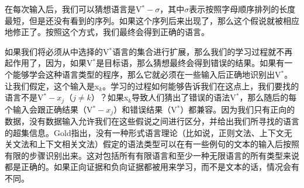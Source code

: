 \noindent
在每次输入后，我们可以猜想语言是V$^* - \sigma$，其中$\sigma$表示按照字母顺序排列的长度最短，但是还没有看到的序列。如果这个序列后来出现了，那么这个假说就被相应地修正了。按照这个方式，我们最终会得到正确的语言。

如果我们将必须从中选择的V$^*$语言的集合进行扩展，那么我们的学习过程就不再起作用了，因为，如果V$^*$是目标语，那么猜想最终会得到错误的结果。如果有一个能够学会这种语言类型的程序，那么它就必须在一些输入后正确地识别出V$^*$。让我们假定，这个输入是x$_k$。学习的过程如何能够告诉我们在这点上，我们要找的语言不是V$^* - x_j$（$j \neq k$）？如果x$_k$导致人们猜出了错误的语法V$^*$，那么随后的每个输入会跟正确结果（V$^* - x_j$）和错误结果（V$^*$）都兼容。因为我们只有正向的数据，没有数据输入允许我们在这些假说之间进行区分，并给出我们所寻找的语言的超集信息。Gold指出，没有一种形式语言理论（比如说，正则文法、上下文无关文法和上下文相关文法）假定的语法类型可以在有一些例句的文本的输入后按照有限的步骤识别出来。这对包括所有有限语言和至少一种无限语言的所有类型来说都是正确的。如果正向证据和负向证据都被用来学习，而不是文本的话，情况会有不同。

